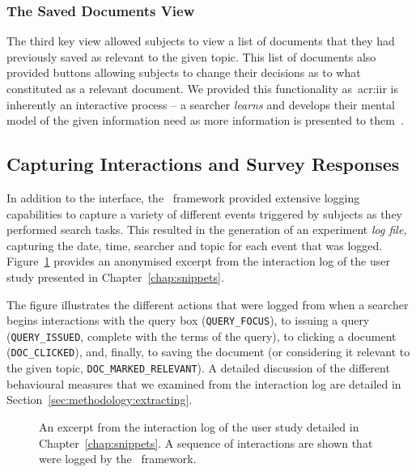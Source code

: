 \subsubsection{The Saved Documents View}\label{sec:methodology:user:interface:saved}
The third key view allowed subjects to view a list of documents that they had previously saved as relevant to the given topic. This list of documents also provided buttons allowing subjects to change their decisions as to what constituted as a relevant document. We provided this functionality as~\gls{acr:iir} is inherently an interactive process -- a searcher \emph{learns} and develops their mental model of the given information need as more information is presented to them~\citep{ingwersen2005theturn}.

\subsection{Capturing Interactions and Survey Responses}\label{sec:methodology:user:capturing}
In addition to the interface, the \treconomics~framework provided extensive logging capabilities to capture a variety of different events triggered by subjects as they performed search tasks. This resulted in the generation of an experiment \emph{log file,} capturing the date, time, searcher and topic for each event that was logged. Figure~\ref{fig:log} provides an anonymised excerpt from the interaction log of the user study presented in Chapter~\ref{chap:snippets}.

The figure illustrates the different actions that were logged from when a searcher begins interactions with the query box (\texttt{QUERY\_FOCUS}), to issuing a query (\texttt{QUERY\_ISSUED}, complete with the terms of the query), to clicking a document (\texttt{DOC\_CLICKED}), and, finally, to saving the document (or considering it relevant to the given topic, \texttt{DOC\_MARKED\_RELEVANT}). A detailed discussion of the different behavioural measures that we examined from the interaction log are detailed in Section~\ref{sec:methodology:extracting}.

\begin{figure}[t!]
    \centering
    \caption[Experiment log file excerpt]{An excerpt from the interaction log of the user study detailed in Chapter~\ref{chap:snippets}. A sequence of interactions are shown that were logged by the \treconomics~framework.}
    \label{fig:log}
\end{figure}

